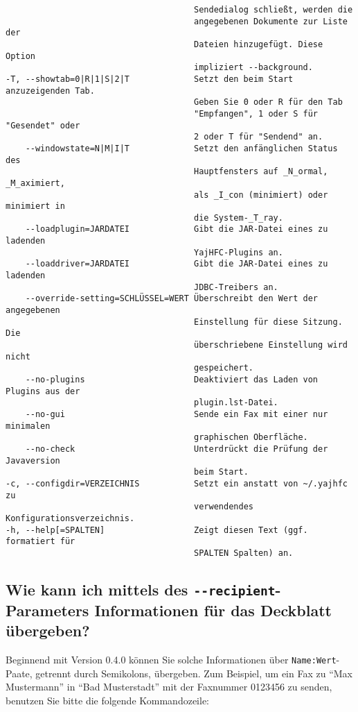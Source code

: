 \documentclass[a4paper,10pt,halfparskip,noparindent]{scrartcl}
\begin{document}
\begin{verbatim}
                                      Sendedialog schließt, werden die
                                      angegebenen Dokumente zur Liste der
                                      Dateien hinzugefügt. Diese Option
                                      impliziert --background.
-T, --showtab=0|R|1|S|2|T             Setzt den beim Start anzuzeigenden Tab.
                                      Geben Sie 0 oder R für den Tab
                                      "Empfangen", 1 oder S für "Gesendet" oder
                                      2 oder T für "Sendend" an.
    --windowstate=N|M|I|T             Setzt den anfänglichen Status des
                                      Hauptfensters auf _N_ormal, _M_aximiert,
                                      als _I_con (minimiert) oder minimiert in
                                      die System-_T_ray.
    --loadplugin=JARDATEI             Gibt die JAR-Datei eines zu ladenden
                                      YajHFC-Plugins an.
    --loaddriver=JARDATEI             Gibt die JAR-Datei eines zu ladenden
                                      JDBC-Treibers an.
    --override-setting=SCHLÜSSEL=WERT Überschreibt den Wert der angegebenen
                                      Einstellung für diese Sitzung. Die
                                      überschriebene Einstellung wird nicht
                                      gespeichert.
    --no-plugins                      Deaktiviert das Laden von Plugins aus der
                                      plugin.lst-Datei.
    --no-gui                          Sende ein Fax mit einer nur minimalen
                                      graphischen Oberfläche.
    --no-check                        Unterdrückt die Prüfung der Javaversion
                                      beim Start.
-c, --configdir=VERZEICHNIS           Setzt ein anstatt von ~/.yajhfc zu
                                      verwendendes Konfigurationsverzeichnis.
-h, --help[=SPALTEN]                  Zeigt diesen Text (ggf. formatiert für
                                      SPALTEN Spalten) an.
\end{verbatim}


\subsection{Wie kann ich mittels des \texttt{-{-}recipient}-Parameters Informationen für das Deckblatt übergeben?}

Beginnend mit Version 0.4.0 können Sie solche Informationen über \texttt{Name:Wert}-Paate, getrennt durch Semikolons, übergeben.
Zum Beispiel, um ein Fax zu "`Max Mustermann"' in "`Bad Musterstadt"' mit der Faxnummer 0123456 zu senden, benutzen Sie bitte die folgende Kommandozeile:
\end{document}
